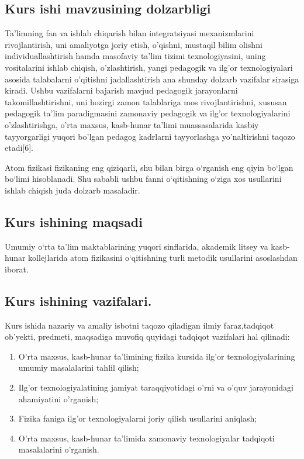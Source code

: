 \documentclass[epsf]{article}
\begin{document}
\subsection{Kurs ishi mavzusining dolzarbligi}
\hspace{0.4cm}
Ta’limning  fan  va  ishlab  chiqarish  bilan  integratsiyasi mexanizmlarini rivojlantirish,  uni  amaliyotga  joriy  etish,  o’qishni,  mustaqil  bilim  olishni individuallashtirish  hamda  masofaviy  ta’lim  tizimi  texnologiyasini,  uning vositalarini  ishlab  chiqish,  o’zlashtirish,  yangi  pedagogik  va  ilg’or texnologiyalari asosida talabalarni o’qitishni jadallashtirish ana shunday dolzarb vazifalar  sirasiga  kiradi.  Ushbu  vazifalarni  bajarish  mavjud  pedagogik jarayonlarni takomillashtirishni,  uni  hozirgi  zamon  talablariga  mos rivojlantirishni, xususan pedagogik ta’lim paradigmasini zamonaviy pedagogik va  ilg’or  texnologiyalarini  o’zlashtirishga,  o’rta  maxsus,  kasb-hunar ta’limi  muassasalarida  kasbiy  tayyorgarligi  yuqori  bo’lgan  pedagog  kadrlarni tayyorlashga yo’naltirishni taqozo etadi[6].

Atom fizikasi fizikaning eng qiziqarli, shu bilan birga o`rganish eng qiyin bo`lgan bo`limi hisoblanadi. Shu sababli ushbu fanni o`qitishning o`ziga xos usullarini ishlab chiqish juda dolzarb masaladir.

\subsection{Kurs ishining maqsadi}
\hspace{0.4cm}
Umumiy o`rta ta'lim maktablarining yuqori sinflarida, akademik  litsey  va  kasb-hunar kollejlarida atom fizikasini o`qitishning turli metodik usullarini    asoslashdan iborat.
\subsection{Kurs ishining  vazifalari.}
\hspace{0.4cm}
Kurs ishida nazariy va  amaliy  isbotni  taqozo  qiladigan  ilmiy  faraz,tadqiqot  ob’yekti,  predmeti, maqsadiga muvofiq quyidagi tadqiqot vazifalari hal qilinadi:
\begin{enumerate}
	\item O’rta  maxsus,  kasb-hunar  ta’limining  fizika  kursida  ilg’or texnologiyalarining umumiy masalalarini tahlil qilish;  
	\item  Ilg’or texnologiyalatining jamiyat taraqqiyotidagi o’rni va o’quv jarayonidagi ahamiyatini o’rganish;
	\item  Fizika  faniga ilg’or  texnologiyalarni  joriy  qilish  usullarini aniqlash;
	\item  O’rta maxsus, kasb-hunar ta’limida zamonaviy texnologiyalar tadqiqoti masalalarini o’rganish.
	
\end{enumerate}
\end{document}
